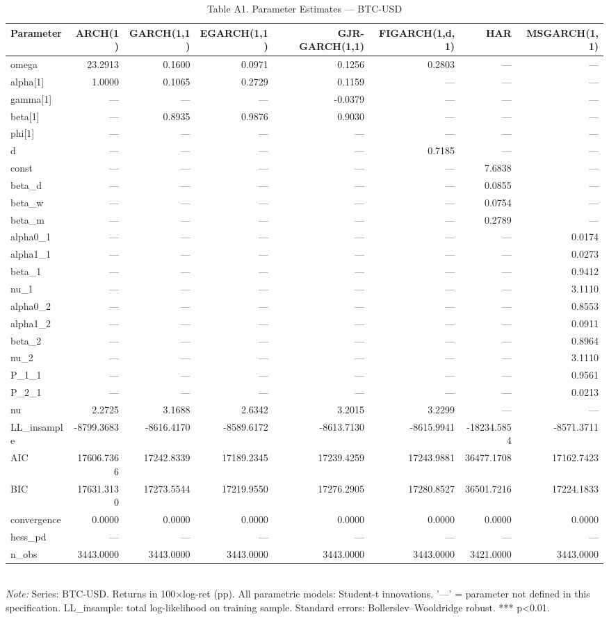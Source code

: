 \begin{table}[ht]
\centering
\caption{Table A1. Parameter Estimates — BTC-USD}
\label{tab:est_btc-usd}
\begin{tabular}{lrrrrrrr}
\toprule
Parameter & ARCH(1) & GARCH(1,1) & EGARCH(1,1) & GJR-GARCH(1,1) & FIGARCH(1,d,1) & HAR & MSGARCH(1,1) \\
\midrule
omega & 23.2913 & 0.1600 & 0.0971 & 0.1256 & 0.2803 & — & — \\
alpha[1] & 1.0000 & 0.1065 & 0.2729 & 0.1159 & — & — & — \\
gamma[1] & — & — & — & -0.0379 & — & — & — \\
beta[1] & — & 0.8935 & 0.9876 & 0.9030 & — & — & — \\
phi[1] & — & — & — & — & — & — & — \\
d & — & — & — & — & 0.7185 & — & — \\
const & — & — & — & — & — & 7.6838 & — \\
beta_d & — & — & — & — & — & 0.0855 & — \\
beta_w & — & — & — & — & — & 0.0754 & — \\
beta_m & — & — & — & — & — & 0.2789 & — \\
alpha0_1 & — & — & — & — & — & — & 0.0174 \\
alpha1_1 & — & — & — & — & — & — & 0.0273 \\
beta_1 & — & — & — & — & — & — & 0.9412 \\
nu_1 & — & — & — & — & — & — & 3.1110 \\
alpha0_2 & — & — & — & — & — & — & 0.8553 \\
alpha1_2 & — & — & — & — & — & — & 0.0911 \\
beta_2 & — & — & — & — & — & — & 0.8964 \\
nu_2 & — & — & — & — & — & — & 3.1110 \\
P_1_1 & — & — & — & — & — & — & 0.9561 \\
P_2_1 & — & — & — & — & — & — & 0.0213 \\
nu & 2.2725 & 3.1688 & 2.6342 & 3.2015 & 3.2299 & — & — \\
LL_insample & -8799.3683 & -8616.4170 & -8589.6172 & -8613.7130 & -8615.9941 & -18234.5854 & -8571.3711 \\
AIC & 17606.7366 & 17242.8339 & 17189.2345 & 17239.4259 & 17243.9881 & 36477.1708 & 17162.7423 \\
BIC & 17631.3130 & 17273.5544 & 17219.9550 & 17276.2905 & 17280.8527 & 36501.7216 & 17224.1833 \\
convergence & 0.0000 & 0.0000 & 0.0000 & 0.0000 & 0.0000 & 0.0000 & 0.0000 \\
hess_pd & — & — & — & — & — & — & — \\
n_obs & 3443.0000 & 3443.0000 & 3443.0000 & 3443.0000 & 3443.0000 & 3421.0000 & 3443.0000 \\
\bottomrule
\end{tabular}
\\[3pt]\footnotesize\textit{Note:} Series: BTC-USD. Returns in 100×log-ret (pp). All parametric models: Student-t innovations. '—' = parameter not defined in this specification. LL_insample: total log-likelihood on training sample. Standard errors: Bollerslev–Wooldridge robust. *** p<0.01.
\end{table}